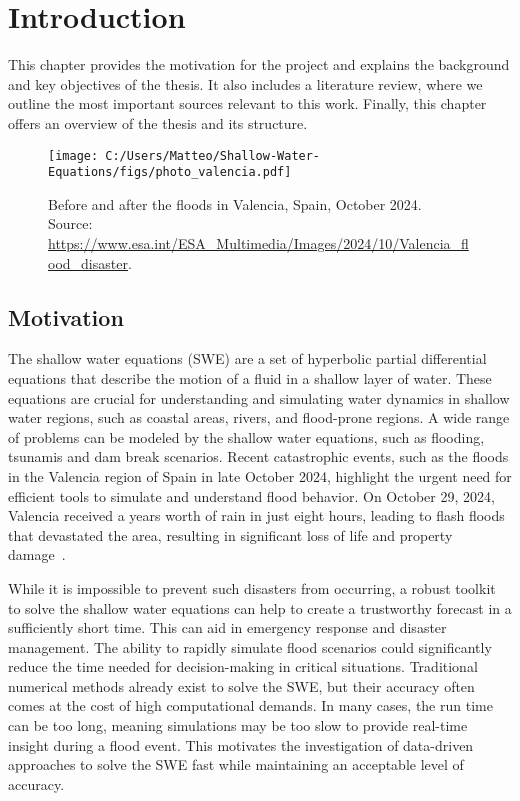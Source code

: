 \chapter{Introduction}
This chapter provides the motivation for the project and explains the background and key objectives of the thesis.
It also includes a literature review, where we outline the most important sources relevant to this work.
Finally, this chapter offers an overview of the thesis and its structure.

\begin{figure}[H]
    \centering
    \texttt{[image: C:/Users/Matteo/Shallow-Water-Equations/figs/photo\_valencia.pdf]}
    \caption{Before and after the floods in Valencia, Spain, October 2024.\\
            Source: \url{https://www.esa.int/ESA_Multimedia/Images/2024/10/Valencia_flood_disaster}.}
\end{figure}

\section{Motivation}
The shallow water equations (SWE) are a set of hyperbolic partial differential equations that describe the motion of a fluid in a shallow layer of water.
These equations are crucial for understanding and simulating water dynamics in shallow water regions, such as coastal areas, rivers, and flood-prone regions.
A wide range of problems can be modeled by the shallow water equations, such as flooding, tsunamis and dam break scenarios.
Recent catastrophic events, such as the floods in the Valencia region of Spain in late October 2024, highlight the urgent need for efficient tools to simulate and understand flood behavior.
On October 29, 2024, Valencia received a years worth of rain in just eight hours, leading to flash floods that devastated the area, resulting in significant loss of life and property damage~\cite{valencia_flood_disaster_esa}.

While it is impossible to prevent such disasters from occurring, a robust toolkit to solve the shallow water equations can help to create a trustworthy forecast in a sufficiently short time.
This can aid in emergency response and disaster management.
The ability to rapidly simulate flood scenarios could significantly reduce the time needed for decision-making in critical situations.
Traditional numerical methods already exist to solve the SWE, but their accuracy often comes at the cost of high computational demands.
In many cases, the run time can be too long, meaning simulations may be too slow to provide real-time insight during a flood event.
This motivates the investigation of data-driven approaches to solve the SWE fast while maintaining an acceptable level of accuracy.

